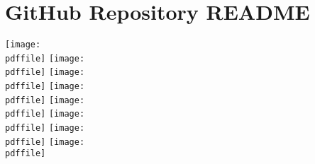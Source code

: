 \appendix

\section{GitHub Repository README}

\def\pdffile{../../README.pdf}
\texttt{[image: \\pdffile]}
\texttt{[image: \\pdffile]}
\texttt{[image: \\pdffile]}
\texttt{[image: \\pdffile]}
\texttt{[image: \\pdffile]}
\texttt{[image: \\pdffile]}
\texttt{[image: \\pdffile]}
\texttt{[image: \\pdffile]}
